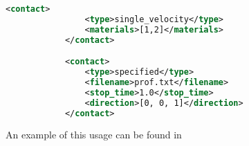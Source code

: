 \begin{lstlisting}[language=XML]
            <contact>
                <type>single_velocity</type>
                <materials>[1,2]</materials>
            </contact>

            <contact>
                <type>specified</type>
                <filename>prof.txt</filename>
                <stop_time>1.0</stop_time>
                <direction>[0, 0, 1]</direction>
            </contact>
\end{lstlisting}
An example of this usage can be found in 


